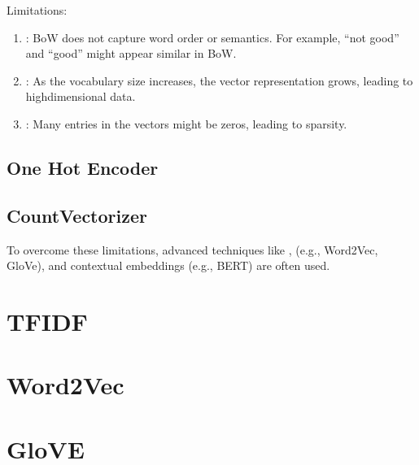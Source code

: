 \documentclass[letterpaper,11pt,english]{sphinxmanual}
\begin{document}
\sphinxAtStartPar
Limitations:
\begin{enumerate}
%
\item {} 
\sphinxAtStartPar
{}:
\sphinxhyphen{} BoW does not capture word order or semantics.
\sphinxhyphen{} For example, “not good” and “good” might appear similar in BoW.

\item {} 
\sphinxAtStartPar
{}:
\sphinxhyphen{} As the vocabulary size increases, the vector representation grows, leading to high\sphinxhyphen{}dimensional data.

\item {} 
\sphinxAtStartPar
{}:
\sphinxhyphen{} Many entries in the vectors might be zeros, leading to sparsity.

\end{enumerate}


\subsection{One Hot Encoder}
\label{\detokenize{embedding:one-hot-encoder}}

\subsection{CountVectorizer}
\label{\detokenize{embedding:countvectorizer}}
\sphinxAtStartPar
To overcome these limitations, advanced techniques like ,  (e.g., Word2Vec, GloVe), and contextual embeddings (e.g., BERT) are often used.


\section{TF\sphinxhyphen{}IDF}
\label{\detokenize{embedding:tf-idf}}

\section{Word2Vec}
\label{\detokenize{embedding:word2vec}}

\section{GloVE}
\label{\detokenize{embedding:glove}}
\end{document}
